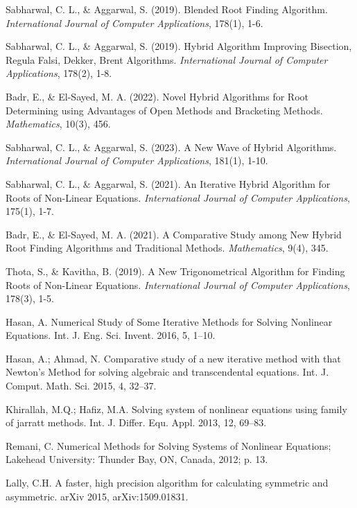 \documentclass[reprint, amsmath, amssymb, aps, prl]{revtex4-2}
\begin{document}
\begin{thebibliography}{99}

Sabharwal, C. L., \& Aggarwal, S. (2019). Blended Root Finding Algorithm. \textit{International Journal of Computer Applications}, 178(1), 1-6.

Sabharwal, C. L., \& Aggarwal, S. (2019). Hybrid Algorithm Improving Bisection, Regula Falsi, Dekker, Brent Algorithms. \textit{International Journal of Computer Applications}, 178(2), 1-8.

Badr, E., \& El-Sayed, M. A. (2022). Novel Hybrid Algorithms for Root Determining using Advantages of Open Methods and Bracketing Methods. \textit{Mathematics}, 10(3), 456.

Sabharwal, C. L., \& Aggarwal, S. (2023). A New Wave of Hybrid Algorithms. \textit{International Journal of Computer Applications}, 181(1), 1-10.

Sabharwal, C. L., \& Aggarwal, S. (2021). An Iterative Hybrid Algorithm for Roots of Non-Linear Equations. \textit{International Journal of Computer Applications}, 175(1), 1-7.

Badr, E., \& El-Sayed, M. A. (2021). A Comparative Study among New Hybrid Root Finding Algorithms and Traditional Methods. \textit{Mathematics}, 9(4), 345.

Thota, S., \& Kavitha, B. (2019). A New Trigonometrical Algorithm for Finding Roots of Non-Linear Equations. \textit{International Journal of Computer Applications}, 178(3), 1-5.

 Hasan, A. Numerical Study of Some Iterative Methods for Solving Nonlinear Equations. Int. J. Eng. Sci. Invent. 2016, 5, 1–10.

 Hasan, A.; Ahmad, N. Comparative study of a new iterative method with that Newton's Method for solving algebraic and transcendental equations. Int. J. Comput. Math. Sci. 2015, 4, 32–37.

 Khirallah, M.Q.; Hafiz, M.A. Solving system of nonlinear equations using family of jarratt methods. Int. J. Differ. Equ. Appl. 2013, 12, 69–83.

 Remani, C. Numerical Methods for Solving Systems of Nonlinear Equations; Lakehead University: Thunder Bay, ON, Canada, 2012; p. 13.

 Lally, C.H. A faster, high precision algorithm for calculating symmetric and asymmetric. arXiv 2015, arXiv:1509.01831.

\end{thebibliography}
\end{document}
